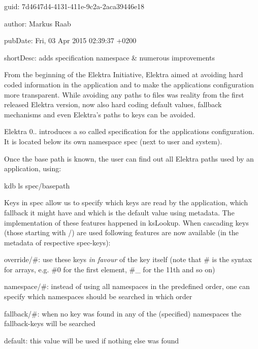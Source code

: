 
\begin{DoxyItemize}
\item guid\+: 7d4647d4-\/4131-\/411e-\/9c2a-\/2aca39446e18
\item author\+: Markus Raab
\item pub\+Date\+: Fri, 03 Apr 2015 02\+:39\+:37 +0200
\item short\+Desc\+: adds specification namespace \& numerous improvements
\end{DoxyItemize}

From the beginning of the Elektra Initiative, Elektra aimed at avoiding hard coded information in the application and to make the application\textquotesingle{}s configuration more transparent. While avoiding any paths to files was reality from the first released Elektra version, now also hard coding default values, fallback mechanisms and even Elektra’s paths to keys can be avoided.

Elektra 0.. introduces a so called specification for the application\textquotesingle{}s configuration. It is located below its own namespace {\ttfamily spec} (next to user and system).

Once the base path is known, the user can find out all Elektra paths used by an application, using\+:


\begin{DoxyCode}
kdb ls spec/basepath
\end{DoxyCode}


Keys in {\ttfamily spec} allow us to specify which keys are read by the application, which fallback it might have and which is the default value using metadata. The implementation of these features happened in {\ttfamily ks\+Lookup}. When cascading keys (those starting with {\ttfamily /}) are used following features are now available (in the metadata of respective {\ttfamily spec}-\/keys)\+:


\begin{DoxyItemize}
\item {\ttfamily override/\#}\+: use these keys {\itshape in favour} of the key itself (note that {\ttfamily \#} is the syntax for arrays, e.\+g. {\ttfamily \#0} for the first element, {\ttfamily \#\+\_} for the 11th and so on)
\item {\ttfamily namespace/\#}\+: instead of using all namespaces in the predefined order, one can specify which namespaces should be searched in which order
\item {\ttfamily fallback/\#}\+: when no key was found in any of the (specified) namespaces the {\ttfamily fallback}-\/keys will be searched
\item {\ttfamily default}\+: this value will be used if nothing else was found
\end{DoxyItemize}

